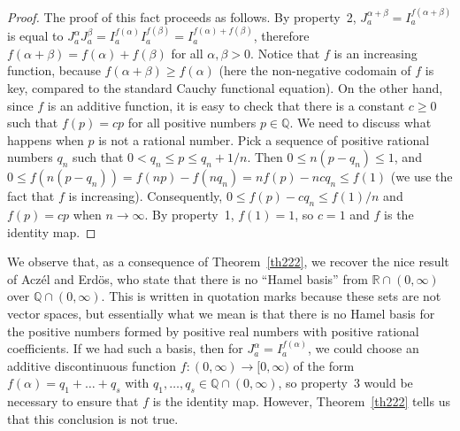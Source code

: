 \documentclass[12pt,reqno]{amsart}
\theoremstyle{plain}
\newtheorem{theorem}{Theorem}[section] %
\numberwithin{equation}{section} %
\begin{document}
\begin{proof}
The proof of this fact proceeds as follows. By property~2, $J_a^{\alpha+\beta}= I_a^{f(\alpha+\beta)}$ is equal to $J_a^\alpha J_a^\beta= I_a^{f(\alpha)} I_a^{f(\beta)}= I_a^{f(\alpha)+f(\beta)}$, therefore $f(\alpha+\beta)=f(\alpha)+f(\beta)$ for all $\alpha,\beta>0$. Notice that $f$ is an increasing function, because $f(\alpha+\beta)\geq f(\alpha)$ (here the non-negative codomain of $f$ is key, compared to the standard Cauchy functional equation). On the other hand, since $f$ is an additive function, it is easy to check that there is a constant $c\geq 0$ such that $f(p)=cp$ for all positive numbers $p\in\mathbb{Q}$. We need to discuss what happens when $p$ is not a rational number. Pick a sequence of positive rational numbers $q_n$ such that $0<q_n\leq p\leq q_n+1/n$. Then $0\leq n(p-q_n)\leq 1$, and $0\leq f(n(p-q_n))=f(np)-f(nq_n)=nf(p)-ncq_n\leq f(1)$ (we use the fact that $f$ is increasing). Consequently, $0\leq f(p)-cq_n\leq f(1)/n$ and $f(p)=cp$ when $n\rightarrow\infty$. By property~1, $f(1)=1$, so $c=1$ and $f$ is the identity map.
\end{proof}



We observe that, as a consequence of Theorem~\ref{th222}, we recover the nice result of Acz\'el and Erd\"os, who state that there is no ``Hamel basis'' from $\mathbb{R}\cap (0,\infty)$ over $\mathbb{Q}\cap (0,\infty)$. This is written in quotation marks because these sets are not vector spaces, but essentially what we mean is that there is no Hamel basis for the positive numbers formed by positive real numbers with positive rational coefficients. If we had such a basis, then for $J_a^\alpha= I_a^{f(\alpha)}$, we could choose an additive discontinuous function $f:(0,\infty)\rightarrow [0,\infty)$ of the form $f(\alpha)=q_1+\ldots+q_s$ with $q_1,\ldots,q_s\in\mathbb{Q}\cap(0,\infty)$, so property~3 would be necessary to ensure that $f$ is the identity map. However, Theorem~\ref{th222} tells us that this conclusion is not true.
\end{document}
